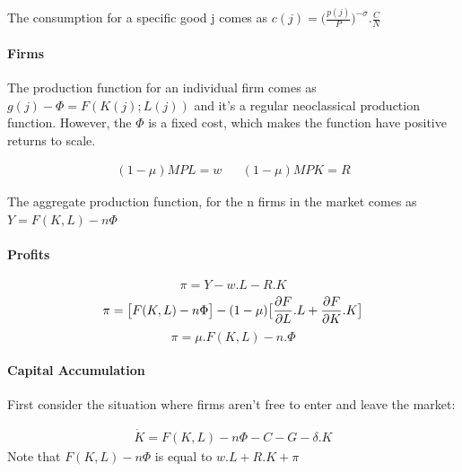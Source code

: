 The consumption for a specific good j comes as $c(j)=\big(\frac{p(j)}{P}\big)^{-\sigma}.\frac{C}{N}$
\paragraph{}

\paragraph{Firms}

The production function for an individual firm comes as $g(j)-\Phi=F(K(j);L(j))$ and it's a regular neoclassical production function. However, the $\Phi$ is a fixed cost, which makes the function have positive returns to scale. 

\begin{equation*}
    \begin{aligned}
        (1-\mu)MPL=w && (1-\mu)MPK=R
    \end{aligned}
\end{equation*}

The aggregate production function, for the n firms in the market comes as $Y=F(K,L)-n\Phi$
\newline
\newline
\paragraph{Profits}

\begin{equation*}
        \pi=Y-w.L-R.K 
\end{equation*}
\begin{equation*}
    \pi=\big[F(K,L)-n\Phi \big]-(1-\mu)\big[\frac{\partial F}{\partial L}.L+\frac{\partial F}{\partial K}.K \big] \\
\end{equation*}
\begin{equation*}
        \pi=\mu.F(K,L)-n.\Phi 
\end{equation*}

  \paragraph{Capital Accumulation}
First consider the situation where firms aren't free to enter and leave the market: 

\begin{equation*}
    \begin{aligned}
        \Dot{K}=F(K,L)-n\Phi-C-G-\delta.K
    \end{aligned}
\end{equation*}
Note that $F(K,L)-n\Phi$ is equal to $w.L+R.K+\pi$
\newline

